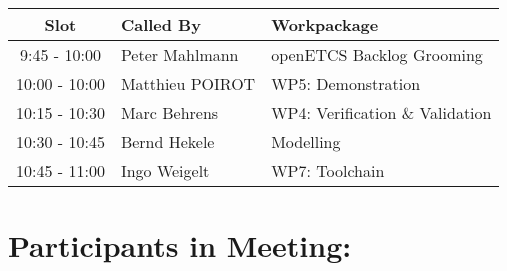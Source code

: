 \documentclass[a4paper, 11pt]{article}
\begin{document}
\begin{tabular}{|c|l|l|}
\hline
\textbf{Slot} &  \textbf{Called By} & \textbf{Workpackage} \\
\hline  
9:45 - 10:00 & Peter Mahlmann & openETCS Backlog Grooming  \\\hline
10:00 - 10:00 & Matthieu POIROT & WP5: Demonstration \\\hline
10:15 - 10:30 & Marc Behrens & WP4: Verification \& Validation \\\hline 
10:30 - 10:45 & Bernd Hekele & Modelling \\\hline
10:45 - 11:00 & Ingo Weigelt  & WP7: Toolchain \\\hline
\end{tabular}

\section{Participants in Meeting:}
\end{document}
